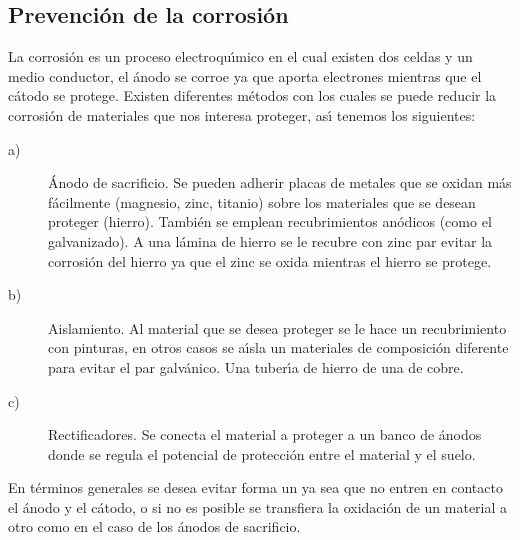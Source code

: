 \subsection{Prevenci\'on de la corrosi\'on}

La corrosi\'on  es un proceso
electroqu\'{\i}mico en el cual existen dos celdas y un medio conductor, el \'anodo se
corroe ya que aporta electrones mientras que el c\'atodo se protege.
Existen diferentes m\'etodos con los cuales se puede reducir la corrosi\'on de materiales
que nos interesa proteger, as\'{\i} tenemos los siguientes:

\begin{description}
\item[a)]\'Anodo de sacrificio. Se pueden adherir placas de metales que se o\-xidan m\'as f\'acilmente (magnesio, zinc, titanio) sobre los materiales que se desean proteger (hierro). Tambi\'en se emplean recubrimientos an\'odicos  (como el galvanizado). A una l\'amina de hierro se le recubre con zinc par evitar la corrosi\'on del hierro ya que el zinc se oxida mientras el hierro se protege.
\item[b)]Aislamiento. Al material que se desea proteger se le hace un recubri\-miento con pinturas, en otros casos se a\'{\i}sla un materiales de composici\'on  diferente para evitar el par galv\'anico. Una tuber\'{\i}a de hierro de una de cobre.
\item[c)] Rectificadores. Se conecta el material a proteger a un banco de \'anodos donde se regula el potencial de protecci\'on entre el material y el suelo.
\end{description}
En t\'erminos generales se desea evitar forma un   ya sea que no entren en contacto el \'anodo y el c\'atodo, o si no es posible se transfiera la oxidaci\'on de un material a otro como en el caso de los \'anodos de sacrificio.
